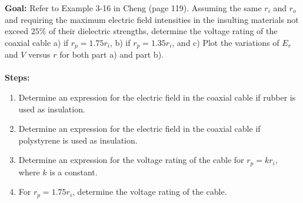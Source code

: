 \documentclass[../../header.tex]{subfiles}
\begin{document}
\textbf{Goal:} Refer to Example 3-16 in Cheng (page 119). Assuming the same $r_i$ and $r_o$ and requiring the maximum electric field intensities in the insulting materials not exceed $25\%$ of their dielectric strengths, determine the voltage rating of the coaxial cable a) if $r_p = 1.75 r_i$, b) if $r_p = 1.35 r_i$, and c) Plot the variations of $E_r$ and $V$ versus $r$ for both part a) and part b).\\
\\
\textbf{Steps:} 
\begin{enumerate}
\item Determine an expression for the electric field in the coaxial cable if rubber is used as insulation.


\item Determine an expression for the electric field in the coaxial cable if polystyrene is used as insulation.


\item Determine an expression for the voltage rating of the cable for $r_p = k r_i$, where $k$ is a constant.


\item For $r_p = 1.75 r_i$, determine the voltage rating of the cable.



\end{enumerate}
\end{document}
